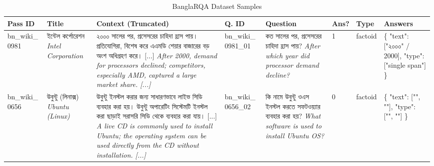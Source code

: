 \documentclass[manuscript,screen,review]{acmart}
\newcommand{\bn}[1]{{\bengalifont #1}}
\begin{document}
\begin{table}[ht!]
    \centering
    \caption{BanglaRQA Dataset Samples}
    \label{tab:banglarqa_samples}
    \small %
    \setlength\tabcolsep{3pt} %
    \renewcommand{\arraystretch}{1.2} %
    
    \begin{tabularx}{\textwidth}{
        >{\raggedright\arraybackslash\scriptsize}p{1.2cm}   %
        >{\raggedright\arraybackslash\scriptsize}p{1.5cm}   %
        >{\scriptsize}X                                      %
        >{\raggedright\arraybackslash\scriptsize}p{1.2cm}   %
        >{\raggedright\arraybackslash\scriptsize}p{2.2cm}   %
        >{\centering\arraybackslash\scriptsize}p{0.6cm}     %
        >{\raggedright\arraybackslash\scriptsize}p{1.0cm}   %
        >{\raggedright\arraybackslash\tiny}p{3.0cm}         %
    }
        \toprule
        \textbf{Pass ID} & \textbf{Title} & \textbf{Context (Truncated)} & \textbf{Q. ID} & \textbf{Question} & \textbf{Ans?} & \textbf{Type} & \textbf{Answers} \\
        \midrule
        
        bn\_wiki\_ 0981 
        & \bn{ইন্টেল কর্পোরেশন} \newline \textit{Intel Corporation}
        & \bn{২০০০ সালের পর, প্রসেসরের চাহিদা হ্রাস পায়। প্রতিযোগিরা, বিশেষ করে এএমডি শেয়ার বাজারের বড় অংশ অধিগ্রহণ করে। [...]} \newline \textit{After 2000, demand for processors declined; competitors, especially AMD, captured a large market share. [...]} 
        & bn\_wiki\_ 0981\_01 
        & \bn{কত সালের পর, প্রসেসরের চাহিদা হ্রাস পায়?} \newline \textit{After which year did processor demand decline?}
        & 1 
        & factoid 
        & \ttfamily \{ "text": ["\bn{২০০০}" / 2000], "type": ["single span"] \} \\
        \midrule
        
        bn\_wiki\_ 0656 
        & \bn{উবুন্টু (লিনাক্স)} \newline \textit{Ubuntu (Linux)}
        & \bn{উবুন্টু ইনস্টল করার জন্য সাধারণভাবে লাইভ সিডি ব্যবহার করা হয়। উবুন্টু অপারেটিং সিস্টেমটি ইনস্টল করা ছাড়াই সরাসরি সিডি থেকে ব্যবহার করা যায়। [...]} \newline \textit{A live CD is commonly used to install Ubuntu; the operating system can be used directly from the CD without installation. [...]} 
        & bn\_wiki\_ 0656\_02 
        & \bn{কি নামে উবুন্টু ওএস ইনস্টল করতে সফটওয়্যার ব্যবহার করা হয়?} \newline \textit{What software is used to install Ubuntu OS?}
        & 0 
        & factoid 
        & \ttfamily \{ "text": ["", ""], "type": ["", ""] \} \\

        \bottomrule
    \end{tabularx}
\end{table}
\end{document}
